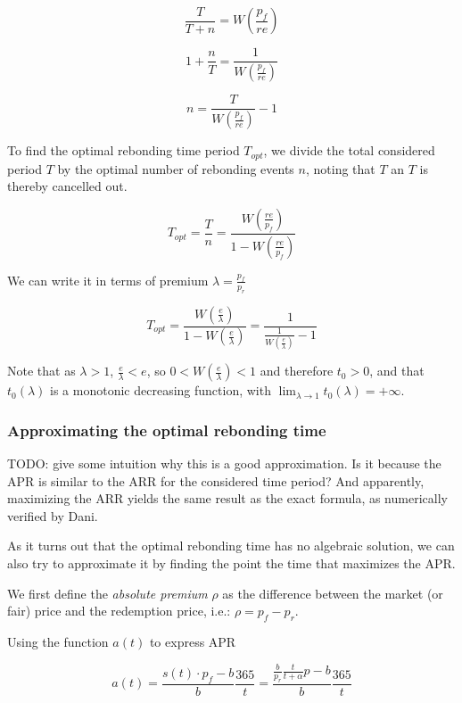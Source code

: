 \documentclass{article}
\begin{document}
\[
\frac{T}{T+n} = W\left(\frac{p_f}{re} \right)
\]

\[
1 + \frac{n}{T} = \frac{1}{W\left(\frac{p_f}{re} \right)}
\]

\[
n = \frac{T}{W\left(\frac{p_f}{re} \right)} - 1
\]

To find the optimal rebonding time period $T_{opt}$, we divide the total considered period $T$ by the optimal number of rebonding events $n$, noting that $T$ an $T$ is thereby cancelled out.

\begin{equation}
  \label{}
T_{opt} = \frac{T}{n} = \frac{W\left(\frac{re}{p_f}\right)}{1 - W\left(\frac{re}{p_f}\right)}
\end{equation}

We can write it in terms of premium $\lambda = \frac{p_f}{p_r}$

\begin{equation}
  \label{eq:opt-rebonding}
T_{opt} = \frac{W\left(\frac{e}{\lambda}\right)}{1 - W\left(\frac{e}{\lambda}\right)} = \frac{1}{\frac{1}{W\left(\frac{e}{\lambda}\right)} - 1}
\end{equation}

Note that as $\lambda > 1$, $\frac{e}{\lambda} < e$, so $0 < W(\frac{e}{\lambda}) < 1$ and therefore $t_0 > 0$, and that $t_0(\lambda)$ is a monotonic decreasing function, with $\lim_{\lambda \rightarrow 1}t_0(\lambda) = +\infty$.


\subsubsection{Approximating the optimal rebonding time}
TODO: give some intuition why this is a good approximation. Is it because the APR is similar to the ARR for the considered time period? And apparently, maximizing the ARR yields the same result as the exact formula, as numerically verified by Dani.

As it turns out that the optimal rebonding time has no algebraic solution, we can also try to approximate it by finding the point the time that maximizes the APR.

We first define the \textit{absolute premium} $\rho$ as the difference between the market (or fair) price and the redemption price, i.e.: $\rho = p_f - p_r$.

Using the function $a(t)$ to express APR

\[
a(t) = \frac{s(t) \cdot p_f - b}{b} \frac{365}{t} = \frac{\frac{b}{p_r} \frac{t}{t+\alpha} p - b}{b} \frac{365}{t}
\]
\end{document}
